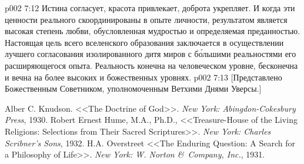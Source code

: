 \vs p002 7:12 Истина согласует, красота привлекает, доброта укрепляет. И когда эти ценности реального скоординированы в опыте личности, результатом является высокая степень любви, обусловленная мудростью и определяемая преданностью. Настоящая цель всего вселенского образования заключается в осуществлении лучшего согласования изолированного дитя миров с б\'ольшими реальностями его расширяющегося опыта. Реальность конечна на человеческом уровне, бесконечна и вечна на более высоких и божественных уровнях.
\vsetoff
\vs p002 7:13 [Представлено Божественным Советником, уполномоченным Ветхими Днями Уверсы.]
\quizlink
\begin{thebibliography}{100}
Alber C. Knudson.
{<<The Doctrine of God>>.}
{\em New York: Abingdon-Cokesbury Press}, 1930.
Robert Ernest Hume, M.A., Ph.D.,
{<<Treasure\hyp{}House of the Living Religions: Selections from Their Sacred Scriptures>>.}
{\em New York: Charles Scribner's Sons}, 1932.
H.A. Overstreet
{<<The Enduring Question: A Search for a Philosophy of Life>>.}
{\em New York: W. Norton \&\ Company, Inc.}, 1931.
\end{thebibliography}
